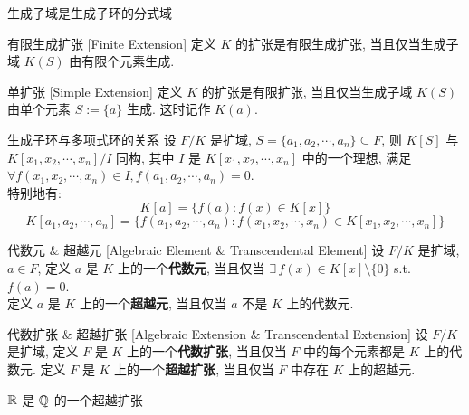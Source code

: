         \begin{ppt}
            {生成子域是生成子环的分式域}
        \end{ppt}

        \begin{dfn}
            {有限生成扩张}
            [Finite Extension]
            定义 \(K\) 的扩张是有限生成扩张, 当且仅当生成子域 \(K(S)\) 由有限个元素生成.
        \end{dfn}

        \begin{dfn}
            {单扩张}
            [Simple Extension]
            定义 \(K\) 的扩张是有限扩张, 当且仅当生成子域 \(K(S)\) 由单个元素 \(S:=\{a\}\) 生成. 这时记作 \(K(a)\). 
        \end{dfn}

        \begin{ppt}
            {生成子环与多项式环的关系}
            设 \(F/K\) 是扩域, \(S=\{a_1,a_2,\cdots,a_n\}\subseteq F\), 则 \(K[S]\) 与 \(K[x_1,x_2,\cdots,x_n]/I\) 同构, 其中 \(I\) 是 \(K[x_1,x_2,\cdots,x_n]\) 中的一个理想, 满足 \(\forall f(x_1,x_2,\cdots,x_n)\in I, f(a_1,a_2,\cdots,a_n)=0\).\\
            特别地有:
            \[K[a]=\{f(a): f(x)\in K[x]\}\]
            \[K[a_1,a_2,\cdots,a_n] = \{f(a_1,a_2,\cdots,a_n): f(x_1,x_2,\cdots,x_n)\in K[x_1,x_2,\cdots,x_n]\}\]
        \end{ppt}

        \begin{dfn}
            {代数元 \& 超越元}
            [Algebraic Element \& Transcendental Element]
            设 \(F/K\) 是扩域, \(a\in F\), 定义 \(a\) 是 \(K\) 上的一个\textbf{代数元}, 当且仅当 \(\exists\,f(x)\in K[x]\setminus\{0\}\) s.t. \(f(a)=0\). \\
            定义 \(a\) 是 \(K\) 上的一个\textbf{超越元}, 当且仅当 \(a\) 不是 \(K\) 上的代数元.
        \end{dfn}

        \begin{dfn}
            {代数扩张 \& 超越扩张}
            [Algebraic Extension \& Transcendental Extension]
            设 \(F/K\) 是扩域, 定义 \(F\) 是 \(K\) 上的一个\textbf{代数扩张}, 当且仅当 \(F\) 中的每个元素都是 \(K\) 上的代数元. 定义 \(F\) 是 \(K\) 上的一个\textbf{超越扩张}, 当且仅当 \(F\) 中存在 \(K\) 上的超越元.
        \end{dfn}

        \begin{ins}
            {\(\operatorname{\mathbb{R}}\) 是 \(\operatorname{\mathbb{Q}}\) 的一个超越扩张}
        \end{ins}

